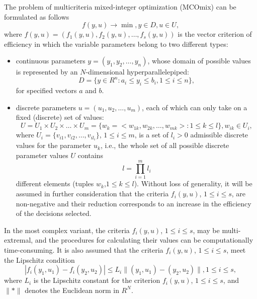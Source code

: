 \documentclass{svproc}
\begin{document}
The problem of multicriteria mixed-integer optimization (MCOmix) can be formulated as follows
\begin{equation}\label{eq:1}
f(y,u)\to \min, y\in D,u \in U,
\end{equation}
where $f(y,u)=(f_1 (y,u),f_2 (y,u), \dots,f_s (y,u))$ is the vector criterion of efficiency in which the variable parameters belong to two different types:
\begin{itemize}
	\item continuous parameters $y=(y_1,y_2,\dots,y_n)$, whose domain of possible values is represented by an $N$-dimensional hyperparallelepiped:
\begin{equation}\label{eq:2}
D=\{ y\in R^n: a_i \leq y_i \leq b_i, 1 \leq i \leq n \}, 
\end{equation}
for specified vectors $a$ and $b$.
	\item discrete parameters  $u=(u_1,u_2, \dots ,u_m)$, each of which can only take on a fixed (discrete) set of values:
\begin{equation}\label{eq:3}
U=U_1 \times U_2 \times \dots \times U_m=\{w_k=<w_{1k},w_{2k}, \dots, w_{mk}>: 1 \leq k \leq l\}, w_{ik} \in U_i, 
\end{equation}
where $U_i=\{v_{i1},v_{i2}, \dots ,v_{il_i} \}$, $1 \leq i \leq m$, is a set of $l_i>0$ admissible discrete values for the parameter $u_k$, i.e., the whole set of all possible discrete parameter values $U$ contains
\begin{equation}\label{eq:4}
  l=\prod\limits^m_{i = 1}{l_i}
\end{equation}
different elements (tuples $w_k$,$1 \leq k \leq l$). Without loss of generality, it will be assumed in further consideration that the criteria $f_i (y,u)$, $1 \leq i \leq s$, are non-negative and their reduction corresponds to an increase in the efficiency of the decisions selected.
\end{itemize}

In the most complex variant, the criteria $f_i(y,u)$, $1 \leq i \leq s$, may be multi-extremal, and the procedures for calculating their values can be computationally time-consuming.  It is also assumed that the criteria $f_i (y,u)$, $1 \leq i \leq s$, meet the Lipschitz condition   
\begin{equation}\label{eq:5}
  |f_i (y_1,u_1 )-f_i (y_2, u_2 )| \leq L_i \|(y_1, u_1)-(y_2, u_2)\|, 1 \leq i \leq s,
\end{equation}
where $L_i$ is the Lipschitz constant for the criterion $f_i (y,u)$, $1 \leq i \leq s$,  and $\|*\|$ denotes the Euclidean norm in $R^N$. 
\end{document}
